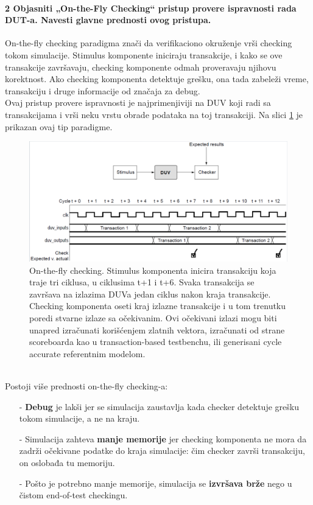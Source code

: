 \documentclass[a4paper, 12pt]{article}
\begin{document}
\paragraph{2 Objasniti „On-the-Fly Checking“ pristup provere ispravnosti rada DUT-a. Navesti glavne prednosti ovog pristupa. } 
\hfill \break
\indent On-the-fly checking paradigma znači da verifikaciono okruženje vrši checking tokom simulacije. Stimulus komponente iniciraju transakcije, i kako se ove transakcije završavaju, checking komponente odmah proveravaju njihovu korektnost. Ako checking komponenta detektuje grešku, ona tada zabeleži vreme, transakciju i druge informacije od značaja za debug.\\
\indent Ovaj pristup provere ispravnosti je najprimenjiviji na DUV koji radi sa transakcijama i vrši neku vrstu obrade podataka na toj transakciji. Na slici \ref{img1} je prikazan ovaj tip paradigme.
\begin{figure}[h!]
\centering
\includegraphics[scale=0.5]{img1.png}
\caption{On-the-fly checking. Stimulus komponenta inicira transakciju koja traje tri ciklusa, u ciklusima t+1 i t+6. Svaka transakcija se završava na izlazima DUVa jedan ciklus nakon kraja transakcije. Checking komponenta oseti kraj izlazne transakcije i u tom trenutku poredi stvarne izlaze sa očekivanim. Ovi očekivani izlazi mogu biti unapred izračunati korišćenjem zlatnih vektora, izračunati od strane scoreboarda kao u transaction-based testbenchu, ili generisani cycle accurate referentnim modelom.}
\label{img1}
\end{figure} 
\\
\indent Postoji više prednosti on-the-fly checking-a:
\begin{itemize}
\item[-]\textbf{Debug} je lakši jer se simulacija zaustavlja kada checker detektuje grešku tokom simulacije, a ne na kraju.
\item[-]Simulacija zahteva \textbf{manje memorije} jer checking komponenta ne mora da zadrži očekivane podatke do kraja simulacije: čim checker završi transakciju, on oslobađa tu memoriju.
\item[-]Pošto je potrebno manje memorije, simulacija se \textbf{izvršava brže} nego u čistom end-of-test checkingu.
\end{itemize}
\end{document}

